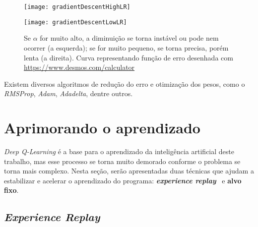 \begin{figure}[h!]
  \begin{minipage}[b]{.45\textwidth}
  \centering
  \texttt{[image: gradientDescentHighLR]}
  \label{fig:gdhighlr}
  \end{minipage}
  \hfill
  \begin{minipage}[b]{.45\textwidth}
  \centering
  \texttt{[image: gradientDescentLowLR]}
  \label{fig:gdlowlr}
  \end{minipage}
  \caption{Se $\alpha$ for muito alto, a diminuição se torna instável ou pode nem ocorrer (a esquerda); se for muito pequeno, se torna precisa, porém lenta (a direita). Curva representando função de erro desenhada com \url{https://www.desmos.com/calculator}}
  \label{fig:gradientDescent}
\end{figure}

Existem diversos algoritmos de redução do erro e otimização dos pesos, como o \textit{RMSProp}, \textit{Adam}, \textit{Adadelta}, dentre outros.


\section{Aprimorando o aprendizado}
\label{sec:enhance}

\textit{Deep Q-Learning} é a base para o aprendizado da inteligência artificial deste trabalho, mas esse processo se torna muito demorado conforme o problema se torna mais complexo.
Nesta seção, serão apresentadas duas técnicas que ajudam a estabilizar e acelerar o aprendizado do programa:
\textit{\textbf{experience replay}}~\cite{Lin1992} e \textbf{alvo fixo}.


\subsection{\textit{Experience Replay}}
\label{sec:er}

